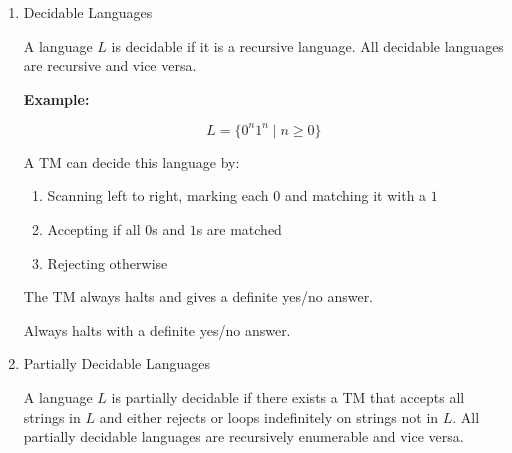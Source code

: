 \documentclass[12pt,a4paper,openany]{article}
\begin{document}
\begin{enumerate}
    \item Decidable Languages
        
        A language \(L\) is decidable if it is a recursive language. All decidable languages are recursive and vice versa.

        \textbf{Example:} 

        \[
        L = \{0^n1^n \mid n \geq 0\}
        \]
   
        A TM can decide this language by:

        \begin{enumerate}
            \item Scanning left to right, marking each \(0\) and matching it with a \(1\)
            \item Accepting if all $0$s and $1$s are matched
            \item Rejecting otherwise
        \end{enumerate}
        
        The TM always halts and gives a definite yes/no answer.

        \begin{center}
        \end{center}

        Always halts with a definite yes/no answer.

    \item Partially Decidable Languages
        
        A language \(L\) is partially decidable if there exists a TM that accepts all strings in \(L\) and either rejects or loops indefinitely on strings not in \(L\).
        All partially decidable languages are recursively enumerable and vice versa.


\end{enumerate}
\end{document}
